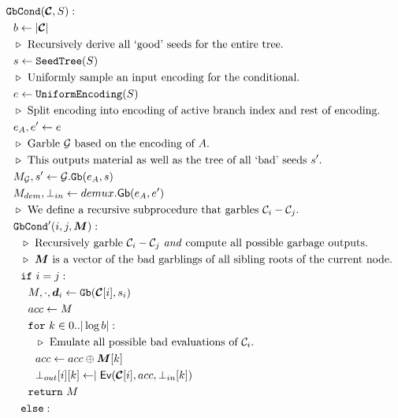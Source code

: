 \begin{figure}
  \begin{align*}
    &\gbcond(\vec{\cir}, S):\\
    &~~b \gets | \vec{\cir} |\\
    &~~\codecomment{Recursively derive all `good' seeds for the entire tree.}\\
    &~~s \gets \mathtt{SeedTree}(S)\\
    &~~\codecomment{Uniformly sample an input encoding for the conditional.}\\
    &~~e \gets \mathtt{UniformEncoding}(S)\\
    &~~\codecomment{Split encoding into encoding of active branch
    index and rest of encoding.}\\
    &~~e_\aid, e' \gets e\\
    &~~\codecomment{Garble \gadget\ based on the encoding of \aid.}\\
    &~~\codecomment{This outputs material as well as the tree of all
    `bad' seeds $s'$.}\\
    &~~\mat_\gadget, s' \gets \gadget.\mathtt{Gb}(e_\aid, s)\\
    &~~\mat_{dem}, \bot_{in} \gets \gbdem(e_\aid, e')\\
    &~~\codecomment{We define a recursive subprocedure that garbles $\cir_i - \cir_j$.}\\
    &~~\gbcond'(i, j, \vec{\mat}):\\
    &~~~~\codecomment{Recursively garble $\cir_i - \cir_j$ \emph{and}
    compute all possible garbage outputs.}\\
    &~~~~\codecomment{$\vec{\mat}$ is a vector of the bad garblings of
      all sibling roots of the current node.}\\
    &~~~~\cif~i = j:\\
    &~~~~~~\mat, \cdot, \vec{d}_i \gets \gb(\vec{\cir}[i], s_{i})\\
    &~~~~~~acc \gets \mat\\
    &~~~~~~\cfor~k \in 0..|\log b|:\\
    &~~~~~~~~\codecomment{Emulate all possible bad evaluations of $\cir_i$.}\\
    &~~~~~~~~acc \gets acc \oplus \vec{\mat}[k]\\
    &~~~~~~~~\bot_{out}[i][k] \gets \mid \gEv(\vec{\cir}[i], acc,
    \bot_{in}[k])\\
    &~~~~~~\creturn~M\\
    &~~~~\celse:\\

\end{align*}
\end{figure}
